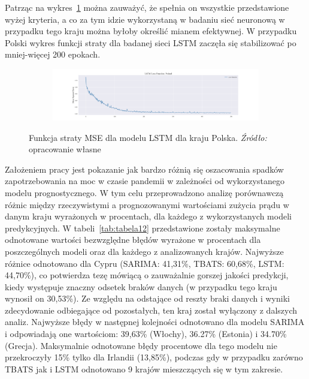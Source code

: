 \documentclass[polish, twoside, 12pt, a4paper]{article}
\theoremstyle{definition}
\theoremstyle{plain}
\theoremstyle{remark}
\begin{document}
Patrząc na wykres~\ref{fig:x14} można zauważyć, że spełnia on wszystkie przedstawione wyżej kryteria, a co za tym idzie wykorzystaną w badaniu sieć neuronową w przypadku tego kraju można byłoby określić mianem efektywnej. W przypadku Polski wykres funkcji straty dla badanej sieci LSTM zaczęła się stabilizować po mniej-więcej 200 epokach.
\begin{figure}[hbt]
  \centering

  \begin{subfigure}[t]{0.95\textwidth}
    \includegraphics[width=\textwidth]{./out_figures/lstm_loss_function_Poland.png}
  \end{subfigure}

  \captionsetup{margin=10pt,font=small,labelfont=bf,width=.8\textwidth}

  \caption[Funkcja straty MSE dla modelu LSTM dla kraju Polska.]{Funkcja straty MSE dla modelu LSTM dla kraju Polska. \textit{Źródło:} opracowanie własne}\label{fig:x14}
\end{figure}

Założeniem pracy jest pokazanie jak bardzo różnią się oszacowania spadków zapotrzebowania na moc w czasie pandemii w zależności od wykorzystanego modelu prognostycznego. W tym celu przeprowadzono analizę porównawczą różnic między rzeczywistymi a prognozowanymi wartościami zużycia prądu w danym kraju wyrażonych w procentach, dla każdego z wykorzystanych modeli predykcyjnych. W tabeli~\ref{tab:tabela12} przedstawione zostały maksymalne odnotowane wartości bezwzględne błędów wyrażone w procentach dla poszczególnych modeli oraz dla każdego z analizowanych krajów. Najwyższe różnice odnotowano dla Cypru (SARIMA: 41,31\%, TBATS: 60,68\%, LSTM: 44,70\%), co potwierdza tezę mówiącą o zauważalnie gorszej jakości predykcji, kiedy występuje znaczny odsetek braków danych (w przypadku tego kraju wynosił on 30,53\%). Ze względu na odstające od reszty braki danych i wyniki zdecydowanie odbiegające od pozostałych, ten kraj został wyłączony z dalszych analiz. Najwyższe błędy w następnej kolejności odnotowano dla modelu SARIMA i odpowiadają one wartościom: 39,63\% (Włochy), 36.27\% (Estonia) i 34.70\% (Grecja). Maksymalnie odnotowane błędy procentowe dla tego modelu nie przekroczyły 15\% tylko dla Irlandii (13,85\%), podczas gdy w przypadku zarówno TBATS jak i LSTM odnotowano 9 krajów mieszczących się w tym zakresie. 
\end{document}
